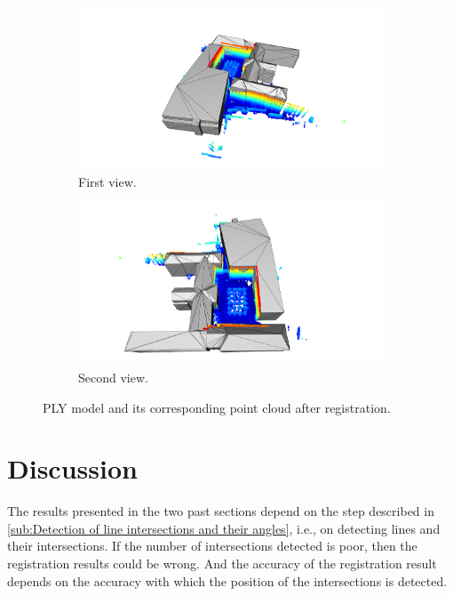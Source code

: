         \begin{figure}[H]
            \centering
            \begin{subfigure}{1\textwidth}
                \centering
                \includegraphics[scale=0.2]{images/solution_images/final_ply_a.png}
                \caption{First view.}
                \label{fig:final_ply_a}
            \end{subfigure}
            \hfill
            \begin{subfigure}{1\textwidth}
                \centering
                \includegraphics[scale=0.2]{images/solution_images/final_ply_b.png}
                \caption{Second view.}
                \label{fig:final_ply_b}
            \end{subfigure}
            \caption{PLY model and its corresponding point cloud after registration.}
            \label{fig:final_ply}
        \end{figure}

    \section{Discussion}
        The results presented in the two past sections depend on the step described in 
        \autoref{sub:Detection of line intersections and their angles}, i.e., on detecting lines and their intersections.
        If the number of intersections detected is poor, then the registration results could be wrong.
        And the accuracy of the registration result depends on the accuracy with which the position of the intersections is detected.


